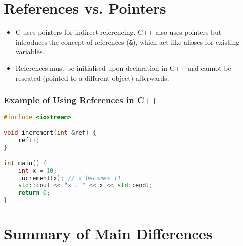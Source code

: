 \documentclass[a4paper,12pt]{article}
\begin{document}
\section{References vs. Pointers}
\begin{itemize}
    \item C uses pointers for indirect referencing. C++ also uses pointers but introduces the concept of references (\texttt{\&}), which act like aliases for existing variables.
    \item References must be initialised upon declaration in C++ and cannot be reseated (pointed to a different object) afterwards.
\end{itemize}

\subsubsection{Example of Using References in C++}
\begin{lstlisting}[language=C++]
#include <iostream>

void increment(int &ref) {
    ref++;
}

int main() {
    int x = 10;
    increment(x); // x becomes 11
    std::cout << "x = " << x << std::endl;
    return 0;
}
\end{lstlisting}

\section{Summary of Main Differences}
\end{document}
